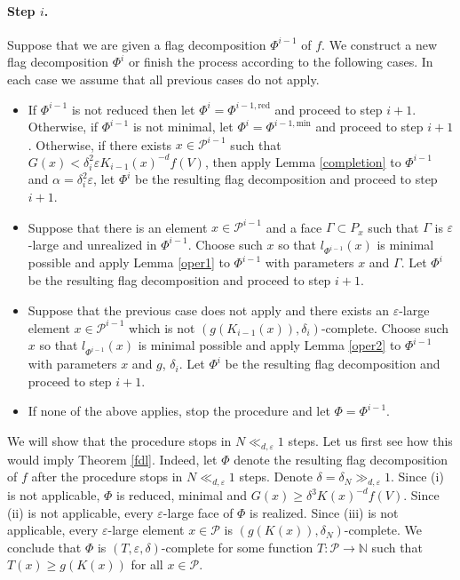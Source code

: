 \documentclass{daj}
\renewcommand{\ge}{\geqslant}
\newcommand{\N}{\mathbb N}
\renewcommand{\P}{\mathcal P}
\theoremstyle{definition}
\theoremstyle{remark}
\theoremstyle{definition}
\theoremstyle{definition}
\begin{document}
\paragraph{Step $i$.} Suppose that we are given a flag decomposition $\Phi^{i-1}$ of $f$. We construct a new flag decomposition $\Phi^i$ or finish the process according to the following cases. In each case we assume that all previous cases do not apply.
\begin{itemize}
    \item[(i)] If $\Phi^{i-1}$ is not reduced then let $\Phi^i = \Phi^{i-1, \text{red}}$ and proceed to step $i+1$. Otherwise, if $\Phi^{i-1}$ is not minimal, let $\Phi^i = \Phi^{i-1, \text{min}}$ and proceed to step $i+1$.
    Otherwise, if there exists $x \in \P^{i-1}$ such that $G(x) < \delta_i^2 \varepsilon K_{i-1}(x)^{-d} f(V)$, then apply Lemma \ref{completion} to $\Phi^{i-1}$ and $\alpha=\delta_i^2 \varepsilon$, let $\Phi^{i}$ be the resulting flag decomposition and proceed to step $i+1$.
    \item[(ii)] Suppose that there is an element $x \in \P^{i-1}$ and a face $\Gamma \subset P_x$ such that $\Gamma$ is $\varepsilon$-large and unrealized in $\Phi^{i-1}$. Choose such $x$ so that $l_{\Phi^{i-1}}(x)$ is minimal possible and apply Lemma \ref{oper1} to $\Phi^{i-1}$ with parameters $x$ and $\Gamma$. Let $\Phi^i$ be the resulting flag decomposition and proceed to step $i+1$.
    \item[(iii)] Suppose that the previous case does not apply and there exists an $\varepsilon$-large element $x \in \P^{i-1}$ which is not $(g(K_{i-1}(x)), \delta_i)$-complete. Choose such $x$ so that $l_{\Phi^{i-1}}(x)$ is minimal possible and apply Lemma \ref{oper2} to $\Phi^{i-1}$ with parameters $x$ and $g$, $\delta_i$. Let $\Phi^i$ be the resulting flag decomposition and proceed to step $i+1$.
    \item[(iv)] If none of the above applies, stop the procedure and let $\Phi = \Phi^{i-1}$.
\end{itemize}

We will show that the procedure stops in $N \ll_{d, \varepsilon} 1$ steps. Let us first see how this would imply Theorem \ref{fdl}. Indeed, let $\Phi$ denote the resulting flag decomposition of $f$ after the procedure stops in $N \ll_{d, \varepsilon} 1$ steps. Denote $\delta = \delta_N \gg_{d, \varepsilon}1$.  
Since (i) is not applicable, $\Phi$ is reduced, minimal and $G(x) \ge \delta^3 K(x)^{-d} f(V)$. Since (ii) is not applicable, every $\varepsilon$-large face of $\Phi$ is realized. Since (iii) is not applicable, every $\varepsilon$-large element $x \in \P$ is $(g(K(x)), \delta_N)$-complete. 
We conclude that $\Phi$ is $(T, \varepsilon, \delta)$-complete for some function $T:\P\rightarrow \N$ such that $T(x) \ge g(K(x))$ for all $x \in \P$. 
\end{document}
